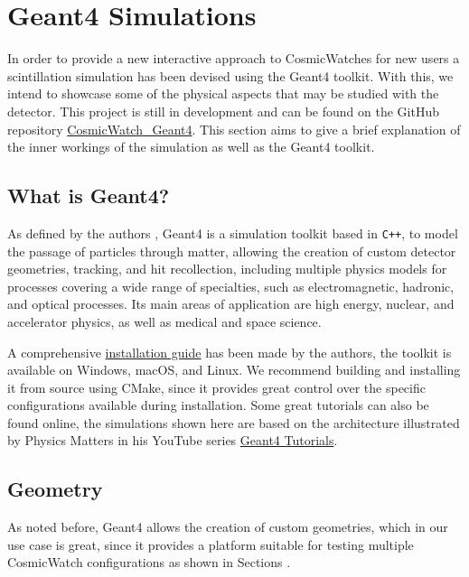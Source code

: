 \chapter{Geant4 Simulations}

In order to provide a new interactive approach to CosmicWatches for new users a scintillation simulation has been devised using the Geant4 toolkit. With this, we intend to showcase some of the physical aspects that may be studied with the detector. This project is still in development and can be found on the GitHub repository \href{https://github.com/spenceraxani/CosmicWatch_Geant4}{CosmicWatch\_Geant4}. This section aims to give a brief explanation of the inner workings of the simulation as well as the Geant4 toolkit.

\section{What is Geant4?}

As defined by the authors \cite{Geant4}, Geant4 is a simulation toolkit based in \texttt{C++}, to model the passage of particles through matter, allowing the creation of custom detector geometries, tracking, and hit recollection, including multiple physics models for processes covering a wide range of specialties, such as electromagnetic, hadronic, and optical processes. Its main areas of application are high energy, nuclear, and accelerator physics, as well as medical and space science.

A comprehensive \href{https://geant4-userdoc.web.cern.ch/UsersGuides/InstallationGuide/html/}{installation guide} has been made by the authors, the toolkit is available on Windows, macOS, and Linux. We recommend building and installing it from source using CMake, since it provides great control over the specific configurations available during installation. Some great tutorials can also be found online, the simulations shown here are based on the architecture illustrated by Physics Matters in his YouTube series \href{https://youtube.com/playlist?list=PLLybgCU6QCGWgzNYOV0SKen9vqg4KXeVL&si=mdzOyTZS0DYsf_vc}{Geant4 Tutorials}.

\section{Geometry}

As noted before, Geant4 allows the creation of custom geometries, which in our use case is great, since it provides a platform suitable for testing multiple CosmicWatch configurations as shown in Sections .

